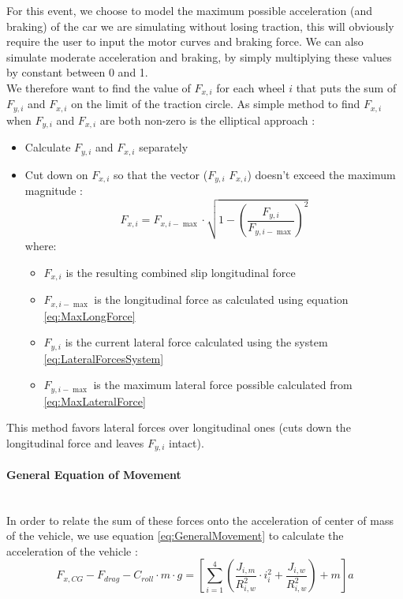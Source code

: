 \documentclass[a4paper, 11pt]{article}
\begin{document}
For this event, we choose to model the maximum possible acceleration (and braking) of the car we are simulating without losing traction, this will obviously require the user to input the motor curves and braking force. We can also simulate moderate acceleration and braking, by simply multiplying these values by constant between 0 and 1.\\

We therefore want to find the value of $F_{x,i}$ for each wheel $i$ that puts the sum of $F_{y,i}$ and $F_{x,i}$ on the limit of the traction circle. As simple method to find $F_{x,i}$ when $F_{y,i}$ and $F_{x,i}$ are both non-zero is the elliptical approach :
\begin{itemize}
	\item Calculate $F_{y,i}$ and $F_{x,i}$ separately
	\item Cut down on $F_{x,i}$ so that the vector ($F_{y,i}$ $F_{x,i}$) doesn't exceed the maximum magnitude :
		\begin{equation}
			F_{x,i} = F_{x,i-\max}\cdot\sqrt{1-\left(\frac{F_{y,i}}{F_{y,i-\max}} \right)^2}
			\label{eq:LongitudinalForce}
		\end{equation}
		where:
		\begin{itemize}
			\item $F_{x,i}$ is the resulting combined slip longitudinal force
			\item $F_{x,i-\max}$ is the longitudinal force as calculated using equation \ref{eq:MaxLongForce}
			\item $F_{y,i}$ is the current lateral force calculated using the system \ref{eq:LateralForcesSystem}
			\item $F_{y,i-\max}$ is the maximum lateral force possible calculated from \ref{eq:MaxLateralForce}
		\end{itemize}
\end{itemize}

This method favors lateral forces over longitudinal ones (cuts down the longitudinal force and leaves $F_{y,i}$ intact).

\paragraph{General Equation of Movement} ~\\
In order to relate the sum of these forces onto the acceleration of center of mass of the vehicle, we use equation \ref{eq:GeneralMovement} to calculate the acceleration of the vehicle :
\begin{equation}
	F_{x,CG} - F_{drag} - C_{roll}\cdot m\cdot g = \left[\sum_{i=1}^{4}\left(\frac{J_{i,m}}{R_{i,w}^2}\cdot i_i^2 + \frac{J_{i,w}}{R_{i,w}^2} \right) + m \right]a
	\label{eq:GeneralMovement}
\end{equation}
\end{document}
